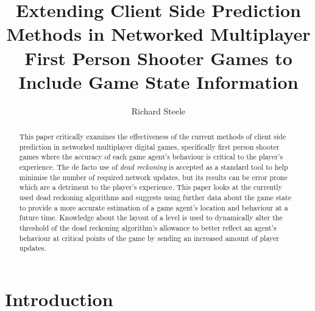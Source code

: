 \documentclass[journal]{IEEEtran}
\begin{document}
%
\title{Extending Client Side Prediction Methods in Networked Multiplayer First Person Shooter Games to Include Game State Information}
%
%
\author{Richard Steele}


\maketitle

\begin{abstract}
This paper critically examines the effectiveness of the current methods of client side prediction in networked multiplayer digital games, specifically first person shooter games where the accuracy of each game agent's behaviour is critical to the player's experience. The de facto use of \textit{dead reckoning} is accepted as a standard tool to help minimise the number of required network updates, but its results can be error prone which are a detriment to the player's experience. This paper looks at the currently used dead reckoning algorithms and suggests using further data about the game state to provide a more accurate estimation of a game agent's location and behaviour at a future time. Knowledge about the layout of a level is used to dynamically alter the threshold of the dead reckoning algorithm's allowance to better reflect an agent's behaviour at critical points of the game by sending an increased amount of player updates.
\end{abstract}

\section{Introduction}
% 
% 
% 
\end{document}
